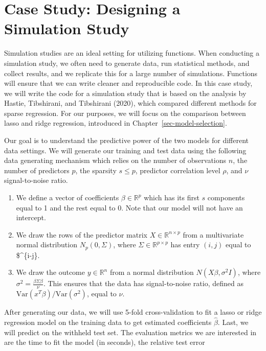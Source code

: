 \documentclass[
  letterpaper,
]{latex/krantz}
\begin{document}
\chapter{Case Study: Designing a Simulation
Study}\label{sec-cs-simulation}

Simulation studies are an ideal setting for
utilizing functions. When conducting a simulation study, we often need
to generate data, run statistical methods, and collect results, and we
replicate this for a large number of simulations. Functions will ensure
that we can write cleaner and reproducible
code. In this case
study, we will write the code for a
simulation study that is based on the analysis by Hastie, Tibshirani,
and Tibshirani (2020), which compared different methods for sparse
regression. For our purposes, we will focus on the comparison between
lasso and ridge
regression, introduced in
Chapter~\ref{sec-model-selection}.

Our goal is to understand the predictive power of the two models for
different data settings. We will generate our training and test data
using the following data generating mechanism which relies on the number
of observations \(n\), the number of predictors \(p\), the sparsity
\(s \leq p\), predictor correlation level \(\rho\), and \(\nu\)
signal-to-noise ratio.

\begin{enumerate}
\def\labelenumi{\arabic{enumi}.}
\item
  We define a vector of coefficients \(\beta \in \mathbb{R}^p\) which
  has its first \(s\) components equal to 1 and the rest equal to 0.
  Note that our model will not have an intercept.
\item
  We draw the rows of the predictor matrix
  \(X \in \mathbb{R}^{n \times p}\) from a multivariate normal
  distribution \(N_p(0, \Sigma)\), where
  \(\Sigma \in \mathbb{R}^{p \times p}\) has entry \((i,j)\) equal to
  \$\rho\^{}\{\textbar i-j\textbar\}.
\item
  We draw the outcome \(y \in \mathbb{R}^n\) from a normal distribution
  \(N(X \beta, \sigma^2 I)\), where
  \(\sigma^2 = \frac{\beta \Sigma \beta}{\nu}\). This ensures that the
  data has signal-to-noise ratio, defined as
  \(\text{Var}(x^T \beta)/\text{Var}(\sigma^2)\), equal to \(\nu\).
\end{enumerate}

After generating our data, we will use 5-fold cross-validation to fit a
lasso or ridge regression model on the training data to get estimated
coefficients \(\hat{\beta}\). Last, we will predict on the withheld test
set. The evaluation metrics we are interested in are the time to fit the
model (in seconds), the relative test error
\end{document}
